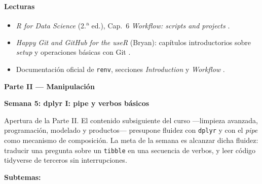 \documentclass[11pt,letterpaper]{article}
\newcommand{\parteCurso}[1]{%
  \clearpage%
  \vspace*{0.5cm}%
  {\centering\color{main}\fontsize{26pt}{32pt}\selectfont\bfseries #1\par}%
  \vspace{0.8cm}%
}
\newcommand{\semana}[2]{%
  \bigskip%
  {\color{main}\Large\bfseries Semana #1: #2\par}%
  \smallskip%
}
\begin{document}
\medskip
\noindent\textbf{Lecturas}
\begin{itemize}[leftmargin=*, itemsep=1pt]
    \item \textit{R for Data Science} (2.\textsuperscript{a} ed.), Cap.\ 6 \textit{Workflow: scripts and projects} \cite{wickham2023r4ds}.
    \item \textit{Happy Git and GitHub for the useR} (Bryan): capítulos introductorios sobre \textit{setup} y operaciones básicas con Git \cite{bryan-happygit}.
    \item Documentación oficial de \texttt{renv}, secciones \textit{Introduction} y \textit{Workflow} \cite{ushey-renv}.
\end{itemize}

\parteCurso{Parte II --- Manipulación}

\semana{5}{dplyr I: pipe y verbos básicos}

Apertura de la Parte II. El contenido subsiguiente del curso ---limpieza avanzada, programación, modelado y productos--- presupone fluidez con \texttt{dplyr} y con el \textit{pipe} como mecanismo de composición. La meta de la semana es alcanzar dicha fluidez: traducir una pregunta sobre un \texttt{tibble} en una secuencia de verbos, y leer código tidyverse de terceros sin interrupciones.

\textbf{Subtemas:}
\end{document}
